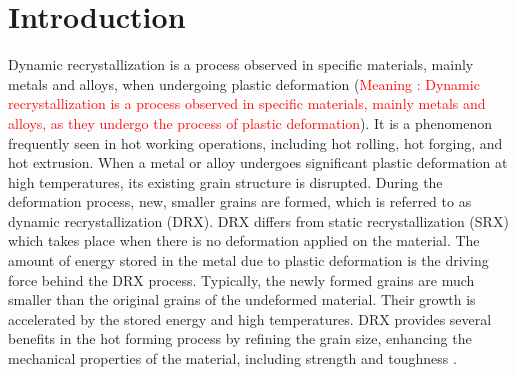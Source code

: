 \documentclass[metals,article,submit,pdftex,moreauthors]{Definitions/mdpi}
\begin{document}
\section{Introduction\label{sec:Introduction}}

Dynamic recrystallization is a process observed in specific materials, mainly metals and alloys, when undergoing plastic deformation (\textcolor{red}{Meaning : Dynamic recrystallization is a process observed in specific materials, mainly metals and alloys, as they undergo the process of plastic deformation}).
It is a phenomenon frequently seen in hot working operations, including hot rolling, hot forging, and hot extrusion.
When a metal or alloy undergoes significant plastic deformation at high temperatures, its existing grain structure is disrupted.
During the deformation process, new, smaller grains are formed, which is referred to as dynamic recrystallization (DRX).
DRX differs from static recrystallization (SRX) which takes place when there is no deformation applied on the material.
The amount of energy stored in the metal due to plastic deformation is the driving force behind the DRX process.
Typically, the newly formed grains are much smaller than the original grains of the undeformed material.
Their growth is accelerated by the stored energy and high temperatures.
DRX provides several benefits in the hot forming process by refining the grain size, enhancing the mechanical properties of the material, including strength and toughness \cite{shen2021effect}.
\end{document}
